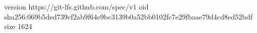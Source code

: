 version https://git-lfs.github.com/spec/v1
oid sha256:069b5ded739cf2ab9f64e9bc3139b0a52bb0102fc7e29fbaae79d4cd8ed52bdf
size 1624
